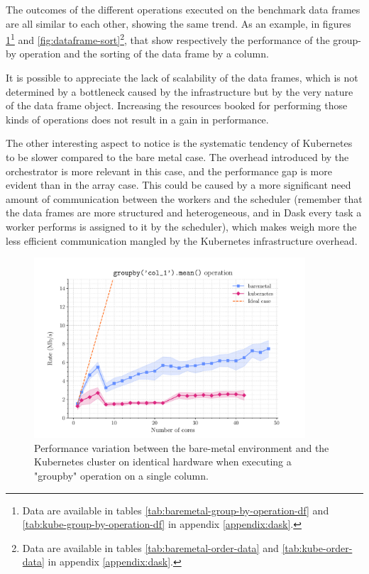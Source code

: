 The outcomes of the different operations executed on the benchmark data frames
are all similar to each other, showing the same trend.
As an example, in figures \ref{fig:dataframe-reduction-std}\footnote{
  Data are available in tables \ref{tab:baremetal-group-by-operation-df} and
  \ref{tab:kube-group-by-operation-df} in appendix \ref{appendix:dask}.
} and \ref{fig:dataframe-sort}\footnote{
  Data are available in tables \ref{tab:baremetal-order-data} and
  \ref{tab:kube-order-data} in appendix \ref{appendix:dask}.
}, that show respectively the performance of the group-by operation and the
sorting of the data frame by a column.

It is possible to appreciate the lack of scalability of the data frames, which
is not determined by a bottleneck caused by the infrastructure but by the very
nature of the data frame object. Increasing the resources booked for performing
those kinds of operations does not result in a gain in performance.

The other interesting aspect to notice is the systematic tendency of Kubernetes
to be slower compared to the bare metal case. The overhead introduced by the
orchestrator is more relevant in this case, and the performance gap is more
evident than in the array case.
This could be caused by a more significant need amount of communication between
the workers and the scheduler (remember that the data frames are more structured
and heterogeneous, and in Dask every task a worker performs is assigned to it by
the scheduler), which makes weigh more the less efficient communication mangled
by the Kubernetes infrastructure overhead.

\begin{figure}
  \centering
  \includegraphics[width=0.9\textwidth]{img/chpt4/df-group-by-operation}
  \caption{Performance variation between the bare-metal environment and the
    Kubernetes cluster on identical hardware when executing a "groupby"
    operation on a single column.}
  \label{fig:dataframe-reduction-std}
\end{figure}

